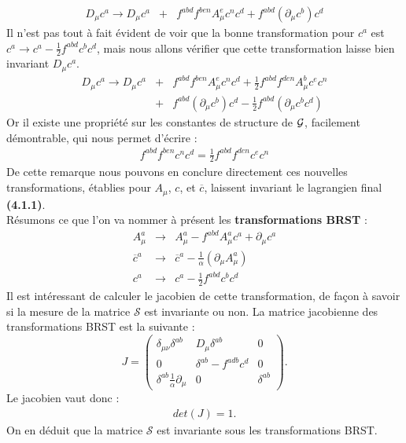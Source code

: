 \documentclass[a4paper,11pt]{article}
\theoremstyle{plain}
\theoremstyle{definition}
\theoremstyle{remark}
\numberwithin{equation}{section}
\numberwithin{equation}{subsection}
\numberwithin{figure}{section}
\begin{document}
\begin{eqnarray}
 D_{\mu}c^{a}  \rightarrow  D_{\mu}c^{a} &+& f^{abd} f^{ben} A^{e}_{\mu} c^{n} c^{d}  +  f^{abd} \left(  \partial_{\mu} c^{b} \right) c^{d}  
\end{eqnarray}
Il n'est pas tout à fait évident de voir que la bonne transformation pour $c^{a}$  est  $c^{a} \rightarrow c^{a} - \frac{1}{2} f^{abd} c^{b} c^{d} $, 
mais nous allons vérifier que cette transformation laisse bien invariant $D_{\mu}c^{a}$.
\begin{eqnarray}
 D_{\mu}c^{a}  \rightarrow  D_{\mu}c^{a} &+& f^{abd} f^{ben} A^{e}_{\mu} c^{n} c^{d}  
+  \frac{1}{2} f^{abd} f^{den} A^{b}_{\mu} c^{e} c^{n}  \nonumber \\
                                         &+& f^{abd} \left(  \partial_{\mu} c^{b} \right) c^{d}  
- \frac{1}{2}  f^{abd}  \left( \partial_{\mu} c^{b} c^{d} \right)  
\end{eqnarray}
Or il existe une propriété sur les constantes de structure de $\cal{G}$, facilement démontrable, qui nous permet d'écrire :
\begin{eqnarray}
 f^{abd} f^{ben} c^{n} c^{d}  = \frac{1}{2} f^{abd} f^{den} c^{e} c^{n}
\end{eqnarray}
De cette remarque nous pouvons en conclure directement ces nouvelles transformations, établies pour $A_{\mu}$, $c$, et $\overline{c}$, laissent 
invariant le lagrangien final \textbf{(4.1.1)}.\\
Résumons ce que l'on va nommer à présent les \textbf{transformations BRST} :
\begin{eqnarray}
 A^{a}_{\mu}    &\rightarrow&    A^{a}_{\mu} - f^{abd} A^{a}_{\mu} c^{a} + \partial_{\mu}c^{a} \\
 \overline{c}^{a} &\rightarrow& \overline{c}^{a} - \frac{1}{\alpha} \left( \partial_{\mu} A^{a}_{\mu} \right) \\
c^{a} &\rightarrow& c^{a} - \frac{1}{2} f^{abd} c^{b} c^{d}
\end{eqnarray}
Il est intéressant de calculer le jacobien de cette transformation, de façon à savoir si la mesure de la matrice $\mathcal{S}$ est invariante ou non.
La matrice jacobienne des transformations BRST est la suivante :
\begin{equation}
J= \left(
 \begin{array}{lcr}
    \delta_{\mu \nu} \delta^{ab}                     & D_{\mu} \delta^{ab}              & 0   \\
    0                                                & \delta^{ab} - f^{adb} c^{d}      & 0   \\
    \delta^{ab} \frac{1}{\alpha}\partial_{\mu}       & 0                                 &\delta^{ab}  
 \end{array} \right).
\end{equation}
Le jacobien vaut donc :
\begin{eqnarray}
 det \left( J \right) = 1.
\end{eqnarray}
On en déduit que la matrice $\mathcal{S}$ est invariante sous les transformations BRST.
\end{document}
